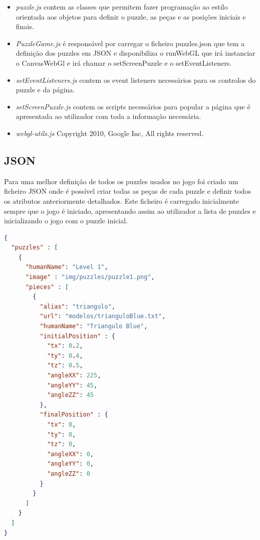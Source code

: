 \documentclass[pdftex,12pt,a4paper]{report}
\begin{document}
\begin{itemize}
        \item \textit{puzzle.js} contem as classes que permitem fazer programação ao estilo orientada aos objetos para definir o puzzle, as peças e as posições iniciais e finais.
        \item \textit{PuzzleGame.js} é responsável por carregar o ficheiro puzzles.json que tem a definição dos puzzles em JSON e disponibiliza o runWebGL que irá instanciar o CanvasWebGl e irá chamar o setScreenPuzzle e o setEventListeners.
	\item \textit{setEventListeners.js} contem os event listeners necessários para os controlos do puzzle e da página.
	\item \textit{setScreenPuzzle.js} contem os scripts necessários para popular a página que é apresentada ao utilizador com toda a informação necessária.
	\item \textit{webgl-utils.js} Copyright 2010, Google Inc, All rights reserved.
	                    
\end{itemize}

\subsection{JSON}

Para uma melhor definição de todos os puzzles usados no jogo foi criado um ficheiro JSON onde é possível criar todas as peças de cada puzzle e definir todos os atributos anteriormente detalhados. Este ficheiro é carregado inicialmente sempre que o jogo é iniciado, apresentando assim ao utilizador a lista de puzzles e inicializando o jogo com o puzzle inicial.

\begin{lstlisting}[language=json,firstnumber=1]
{
  "puzzles" : [
    {
      "humanName": "Level 1",
      "image" : "img/puzzles/puzzle1.png",
      "pieces" : [
        {
          "alias": "triangulo",
          "url": "modelos/trianguloBlue.txt",
          "humanName": "Triangulo Blue",
          "initialPosition" : {
            "tx": 0.2,
            "ty": 0.4,
            "tz": 0.5,
            "angleXX": 225,
            "angleYY": 45,
            "angleZZ": 45
          },
          "finalPosition" : {
            "tx": 0,
            "ty": 0,
            "tz": 0,
            "angleXX": 0,
            "angleYY": 0,
            "angleZZ": 0
          }
        }
      ]
    }
  ]
}
\end{lstlisting}

\newpage
\end{document}
